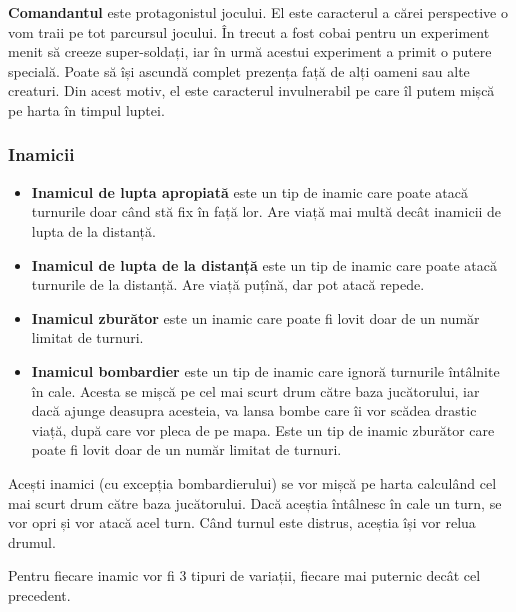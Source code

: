 \documentclass[12pt, a4paper]{article}
\begin{document}
	\textbf{Comandantul} este protagonistul jocului. El este caracterul a cărei perspective o vom traii pe tot parcursul jocului. În trecut a fost cobai pentru un experiment menit să creeze super-soldați, iar în urmă acestui experiment a primit o putere specială. Poate să își ascundă complet prezența față de alți oameni sau alte creaturi. Din acest motiv, el este caracterul invulnerabil pe care îl putem mișcă pe harta în timpul luptei.
	
	
	
	
	
	\subsubsection{Inamicii}
	\begin{itemize}
		\item \textbf{Inamicul de lupta apropiată} este un tip de inamic care poate atacă turnurile doar când stă fix în față lor. Are viață mai multă decât inamicii de lupta de la distanță.
		\item \textbf{Inamicul de lupta de la distanță} este un tip de inamic care poate atacă turnurile de la distanță. Are viață puțînă, dar pot atacă repede.
		\item \textbf{Inamicul zburător} este un inamic care poate fi lovit doar de un număr limitat de turnuri.
		\item \textbf{Inamicul bombardier} este un tip de inamic care ignoră turnurile întâlnite în cale. Acesta se mișcă pe cel mai scurt drum către baza jucătorului, iar dacă ajunge deasupra acesteia, va lansa bombe care îi vor scădea drastic viață, după care vor pleca de pe mapa. Este un tip de inamic zburător care poate fi lovit doar de un număr limitat de turnuri.
	\end{itemize}
	
	Acești inamici (cu excepția bombardierului) se vor mișcă pe harta calculând cel mai scurt drum către baza jucătorului. Dacă aceștia întâlnesc în cale un turn, se vor opri și vor atacă acel turn. Când turnul este distrus, aceștia își vor relua drumul.
	\newline
	
	Pentru fiecare inamic vor fi 3 tipuri de variații, fiecare mai puternic decât cel precedent.
	
	
	
	
	
\end{document}
